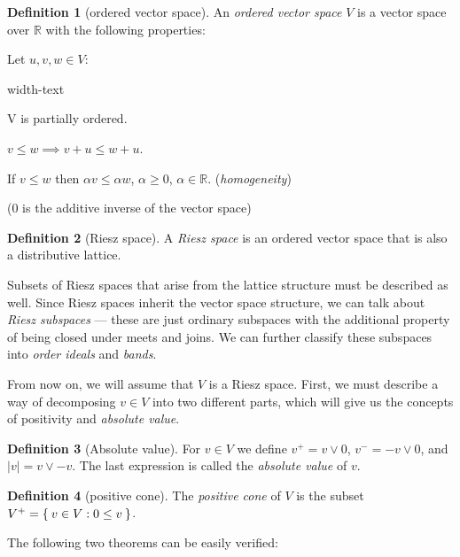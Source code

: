 \documentclass[letterpaper,10pt,oneside,onecolumn,reqno]{amsart}
\newcommand{\R}{\mathbb R}
\theoremstyle{definition}
\newtheorem{defn}{Definition}
\newcommand{\join}{\vee}
\begin{document}
  \begin{defn}[ordered vector space]\label{def:3}
    An \emph{ordered vector space} $V$ is
    a vector space over $\R$ with the following properties:


    Let $u,v,w \in V$:
    \begin{deflist}{width-text}
    \item V is partially ordered.
    \item $v \leq w \implies v + u \leq w + u$.
    \item If $v \leq w$ then $\alpha v \leq \alpha w$, $\alpha \geq
      0$, $\alpha \in \R$. (\emph{homogeneity})
    \end{deflist}

    ($0$ is the additive inverse of the vector space)
  \end{defn}

\begin{defn}[Riesz space]\label{def:4}
  A \emph{Riesz space} is an ordered vector space
  that is also a distributive lattice.
\end{defn}

Subsets of Riesz spaces that arise from the lattice structure must be
described as well. Since Riesz spaces inherit the vector space
structure, we can talk about \emph{Riesz subspaces} --- these are just
ordinary subspaces with the additional property of being closed under
meets and joins. We can further classify these subspaces into
\emph{order ideals} and \emph{bands}.

From now on, we will assume that $V$ is a Riesz space. First, we must
describe a way of decomposing $v \in V$ into two different parts,
which will give us the concepts of positivity and \emph{absolute
  value}.

  \begin{defn}[Absolute value]\label{def:5}
    For $v \in V$ we define $v^+=v \join 0$, $v^-=-v \join 0$, and
    $|v| = v \join -v$. The last expression is called the
    \emph{absolute value} of $v$.
  \end{defn}

  \begin{defn}[positive cone]\label{def:6}
    The \emph{positive cone} of $V$ is the subset
    $V^+ = \Set{v \in V : 0 \leq v}$.
  \end{defn}

  The following two theorems can be easily verified:
\end{document}
